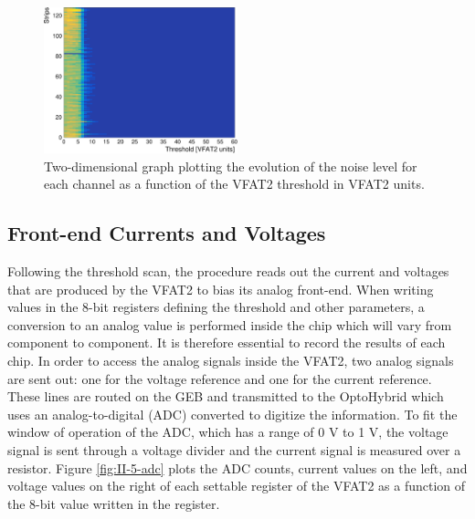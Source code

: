       \begin{figure}[h!]
        \centering
        \includegraphics[width=0.5\textwidth]{img/plots/cThreshold_Channel-crop}
        \caption{Two-dimensional graph plotting the evolution of the noise level for each channel as a function of the VFAT2 threshold in VFAT2 units.}
        \label{fig:II-5-threshold}
      \end{figure}

    \subsection{Front-end Currents and Voltages}

      Following the threshold scan, the procedure reads out the current and voltages that are produced by the VFAT2 to bias its analog front-end. When writing values in the 8-bit registers defining the threshold and other parameters, a conversion to an analog value is performed inside the chip which will vary from component to component. It is therefore essential to record the results of each chip. In order to access the analog signals inside the VFAT2, two analog signals are sent out: one for the voltage reference and one for the current reference. These lines are routed on the GEB and transmitted to the OptoHybrid which uses an analog-to-digital (ADC) converted to digitize the information. To fit the window of operation of the ADC, which has a range of 0 V to 1 V, the voltage signal is sent through a voltage divider and the current signal is measured over a resistor. Figure \ref{fig:II-5-adc} plots the ADC counts, current values on the left, and voltage values on the right of each settable register of the VFAT2 as a function of the 8-bit value written in the register. \\

